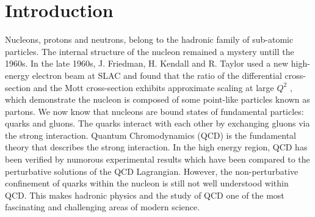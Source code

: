 

\chapter{Introduction}
\label{C1}

Nucleons, protons and neutrons, belong to the hadronic family of sub-atomic particles. The internal structure of the nucleon remained a mystery untill the 1960s. In the late 1960s, J. Friedman, H. Kendall and R. Taylor used a new high-energy electron beam at SLAC and found that the ratio of the differential cross-section and the Mott cross-section exhibits approximate scaling at large $Q^2$ \cite{Breidenbach1969}, which demonstrate the nucleon is composed of some point-like particles known as partons. We now know that nucleons are bound states of fundamental particles: quarks and gluons. The quarks interact with each other by exchanging gluons via the strong interaction. Quantum Chromodynamics (QCD) is the fundamental theory that describes the strong interaction. In the high energy region, QCD has been verified by numorous experimental results which have been compared to the perturbative solutions of the QCD Lagrangian. However, the non-perturbative confinement of quarks within the nucleon is still not well understood within QCD. This makes hadronic physics and the study of QCD one of the most fascinating and challenging areas of modern science.

